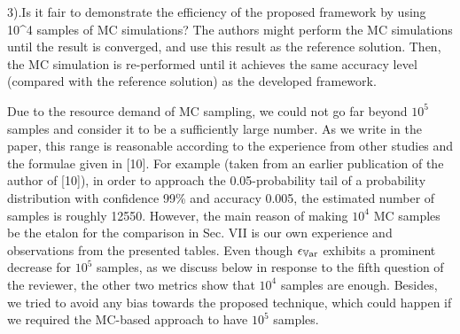 \begin{reviewer}
3).Is it fair to demonstrate the efficiency of the proposed framework by using 10\^{}4 samples of MC simulations? The authors might perform the MC simulations until the result is converged, and use this result as the reference solution. Then, the MC simulation is re-performed until it achieves the same accuracy level (compared with the reference solution) as the developed framework.
\end{reviewer}
\begin{authors}
Due to the resource demand of MC sampling, we could not go far beyond $10^5$ samples and consider it to be a sufficiently large number.
As we write in the paper, this range is reasonable according to the experience from other studies and the formulae given in [10].
For example (taken from an earlier publication of the author of [10]), in order to approach the 0.05-probability tail of a probability distribution with confidence 99\% and accuracy 0.005, the estimated number of samples is roughly 12550.
However, the main reason of making $10^4$ MC samples be the etalon for the comparison in Sec. VII is our own experience and observations from the presented tables.
Even though $\epsilon_{\mathbb{V}\text{ar}}$ exhibits a prominent decrease for $10^5$ samples, as we discuss below in response to the fifth question of the reviewer, the other two metrics show that $10^4$ samples are enough. Besides, we tried to avoid any bias towards the proposed technique, which could happen if we required the MC-based approach to have $10^5$ samples.
\end{authors}

